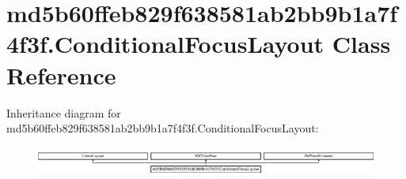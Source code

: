 \hypertarget{classmd5b60ffeb829f638581ab2bb9b1a7f4f3f_1_1ConditionalFocusLayout}{}\section{md5b60ffeb829f638581ab2bb9b1a7f4f3f.\+Conditional\+Focus\+Layout Class Reference}
\label{classmd5b60ffeb829f638581ab2bb9b1a7f4f3f_1_1ConditionalFocusLayout}
Inheritance diagram for md5b60ffeb829f638581ab2bb9b1a7f4f3f.\+Conditional\+Focus\+Layout\+:\begin{figure}[H]
\begin{center}
\leavevmode
\includegraphics[height=0.959726cm]{classmd5b60ffeb829f638581ab2bb9b1a7f4f3f_1_1ConditionalFocusLayout}
\end{center}
\end{figure}
